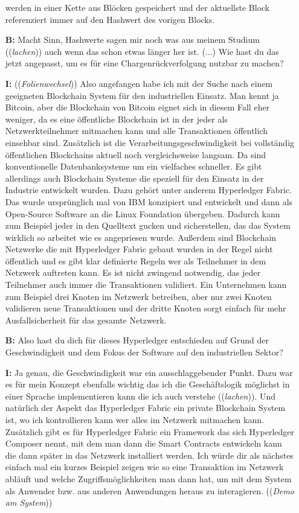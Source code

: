 \begin{itemize}
werden in einer Kette aus Blöcken gespeichert und der aktuellste Block referenziert immer auf den Hashwert des vorigen Blocks.
  \item[\textbf{B:}] Macht Sinn, Hashwerte sagen mir noch was aus meinem Studium ((\textit{lachen})) auch wenn das schon etwas länger her ist. (...) Wie hast du das jetzt angepasst, um es für eine Chargenrückverfolgung nutzbar zu machen?
  \item[\textbf{I:}] ((\textit{Folienwechsel})) Also angefangen habe ich mit der Suche nach einem geeigneten Blockchain System für den industriellen Einsatz. Man kennt ja Bitcoin, aber die Blockchain von Bitcoin eignet sich in diesem Fall eher weniger, da es eine öffentliche Blockchain ist in der jeder als Netzwerkteilnehmer mitmachen kann und alle Transaktionen öffentlich einsehbar sind. Zusätzlich ist die Verarbeitungsgeschwindigkeit bei vollständig öffentlichen Blockchains aktuell noch vergleichsweise langsam. Da sind konventionelle Datenbanksysteme um ein vielfaches schneller. Es gibt allerdings auch Blockchain Systeme die speziell für den Einsatz in der Industrie entwickelt wurden. Dazu gehört unter anderem Hyperledger Fabric. Das wurde ursprünglich mal von IBM konzipiert und entwickelt und dann als Open-Source Software an die Linux Foundation übergeben. Dadurch kann zum Beispiel jeder in den Quelltext gucken und sicherstellen, das das System wirklich so arbeitet wie es angepriesen wurde. Außerdem sind Blockchain Netzwerke die mit Hyperledger Fabric gebaut wurden in der Regel nicht öffentlich und es gibt klar definierte Regeln wer als Teilnehmer in dem Netzwerk auftreten kann. Es ist nicht zwingend notwendig, das jeder Teilnehmer auch immer die Transaktionen validiert. Ein Unternehmen kann zum Beispiel drei Knoten im Netzwerk betreiben, aber nur zwei Knoten validieren neue Transaktionen und der dritte Knoten sorgt einfach für mehr Ausfallsicherheit für das gesamte Netzwerk.
  \item[\textbf{B:}] Also hast du dich für dieses Hyperledger entschieden auf Grund der Geschwindigkeit und dem Fokus der Software auf den industriellen Sektor?
  \item[\textbf{I:}] Ja genau, die Geschwindigkeit war ein ausschlaggebender Punkt. Dazu war es für mein Konzept ebenfalls wichtig das ich die Geschäftslogik möglichst in einer Sprache implementieren kann die ich auch verstehe ((\textit{lachen})). Und natürlich der Aspekt das Hyperledger Fabric ein private Blockchain System ist, wo ich kontrollieren kann wer alles im Netzwerk mitmachen kann. Zusätzlich gibt es für Hyperledger Fabric ein Framework das sich Hyperledger Composer nennt, mit dem man dann die Smart Contracts entwickeln kann die dann später in das Netzwerk installiert werden. Ich würde dir als nächstes einfach mal ein kurzes Beispiel zeigen wie so eine Transaktion im Netzwerk abläuft und welche Zugriffsmöglichkeiten man dann hat, um mit dem System als Anwender bzw. aus anderen Anwendungen heraus zu interagieren. ((\textit{Demo am System}))

\end{itemize}
